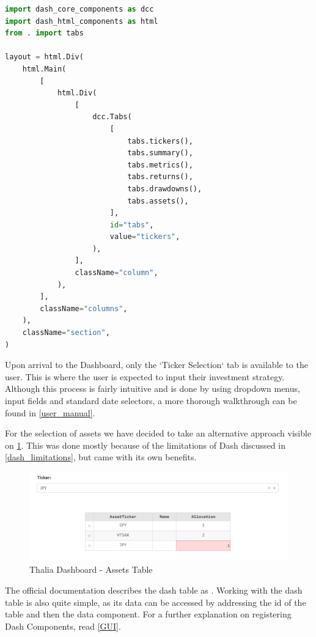 \documentclass[main.tex]{subfiles}
\begin{document}
\begin{lstlisting}[language=Python, caption=layout.py - Example of Dash Code, label=lst:dash_code]
import dash_core_components as dcc
import dash_html_components as html
from . import tabs

layout = html.Div(
    html.Main(
        [
            html.Div(
                [
                    dcc.Tabs(
                        [
                            tabs.tickers(),
                            tabs.summary(),
                            tabs.metrics(),
                            tabs.returns(),
                            tabs.drawdowns(),
                            tabs.assets(),
                        ],
                        id="tabs",
                        value="tickers",
                    ),
                ],
                className="column",
            ),
        ],
        className="columns",
    ),
    className="section",
)
\end{lstlisting}

Upon arrival to the Dashboard, only the `Ticker Selection` tab is available to the user. This is where the user is expected to input their investment strategy. Although this process is fairly intuitive and is done by using dropdown menus, input fields and standard date selectors, a more thorough walkthrough can be found in \ref{user_manual}. 

For the selection of assets we have decided to take an alternative approach visible on \figurename{\ref{thalia_table}}. This was done mostly because of the limitations of Dash discussed in \ref{dash_limitations}, but came with its own benefits.

\begin{figure}[H]
   \centering
   \includegraphics[width=\textwidth]{08Appendices/081User/081Pictures/table.png}
   \caption{Thalia Dashboard - Assets Table}
   \label{thalia_table}
\end{figure}

The official documentation describes the dash table as  \cite{dash_table}. Working with the dash table is also quite simple, as its data can be accessed by addressing the id of the table and then the data component. For a further explanation on registering Dash Components, read \ref{GUI}.
\end{document}
